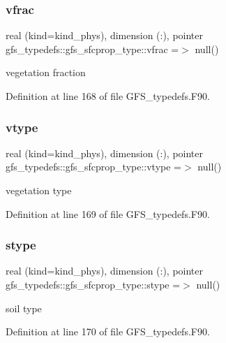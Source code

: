\subsubsection{vfrac}
{\footnotesize\ttfamily real (kind=kind\+\_\+phys), dimension  (\+:), pointer gfs\+\_\+typedefs\+::gfs\+\_\+sfcprop\+\_\+type\+::vfrac =$>$ null()}



vegetation fraction 



Definition at line 168 of file G\+F\+S\+\_\+typedefs.\+F90.

\mbox{\label{structgfs__typedefs_1_1gfs__sfcprop__type_a1d7ab9059e9f4717201b8905ebfc48b3}} 
\subsubsection{vtype}
{\footnotesize\ttfamily real (kind=kind\+\_\+phys), dimension  (\+:), pointer gfs\+\_\+typedefs\+::gfs\+\_\+sfcprop\+\_\+type\+::vtype =$>$ null()}



vegetation type 



Definition at line 169 of file G\+F\+S\+\_\+typedefs.\+F90.

\mbox{\label{structgfs__typedefs_1_1gfs__sfcprop__type_af420a0b282b8c44887e4ee33176f6e82}} 
\subsubsection{stype}
{\footnotesize\ttfamily real (kind=kind\+\_\+phys), dimension  (\+:), pointer gfs\+\_\+typedefs\+::gfs\+\_\+sfcprop\+\_\+type\+::stype =$>$ null()}



soil type 



Definition at line 170 of file G\+F\+S\+\_\+typedefs.\+F90.

\mbox{\label{structgfs__typedefs_1_1gfs__sfcprop__type_a950355c1526b778cd2d79f7bec9288e4}} 
